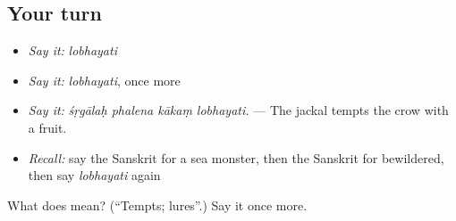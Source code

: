 \subsection*{Your turn}
\begin{itemize}
\raggedright
  \item \emph{Say it:} \emph{lobhayati}
  \item \emph{Say it:} \emph{lobhayati}, once more
  \item \emph{Say it:} \emph{śṛgālaḥ phalena kākaṃ lobhayati.} — The jackal tempts the crow with a fruit.
  \item \emph{Recall:} say the Sanskrit for a sea monster, then the Sanskrit for bewildered, then say \emph{lobhayati} again
\end{itemize}

\begin{tcolorbox}[breakable,colback=teal!4,colframe=teal!35!black,title={Before you move on}]
What does  mean? (\textquotedblleft{}Tempts; lures\textquotedblright{}.) Say it once more.
\end{tcolorbox}
